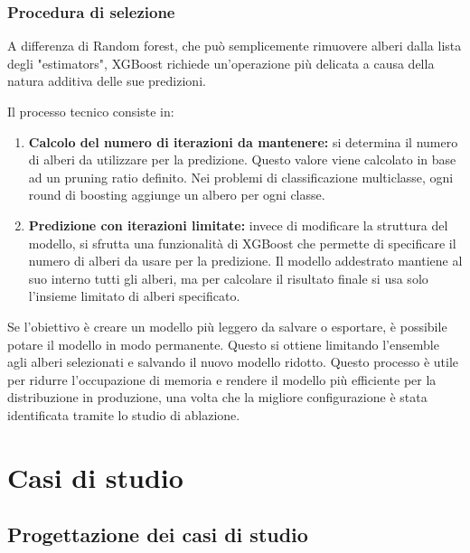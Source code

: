 \documentclass[a4paper,12pt]{report}
\begin{document}
	\subsection{Procedura di selezione}
	A differenza di Random forest, che può semplicemente rimuovere alberi dalla lista degli "estimators", XGBoost richiede un'operazione più delicata a causa della natura additiva delle sue predizioni.
	
	Il processo tecnico consiste in:
	\begin{enumerate}
		\item \textbf{Calcolo del numero di iterazioni da mantenere:} si determina il numero di alberi da utilizzare per la predizione. Questo valore viene calcolato in base ad un pruning ratio definito. Nei problemi di classificazione multiclasse, ogni round di boosting aggiunge un albero per ogni classe.
		\item \textbf{Predizione con iterazioni limitate:} invece di modificare la struttura del modello, si sfrutta una funzionalità di XGBoost che permette di specificare il numero di alberi da usare per la predizione. Il modello addestrato mantiene al suo interno tutti gli alberi, ma per calcolare il risultato finale si usa solo l'insieme limitato di alberi specificato.
	\end{enumerate}
	
	Se l'obiettivo è creare un modello più leggero da salvare o esportare, è possibile potare il modello in modo permanente. Questo si ottiene limitando l'ensemble agli alberi selezionati e salvando il nuovo modello ridotto. Questo processo è utile per ridurre l'occupazione di memoria e rendere il modello più efficiente per la distribuzione in produzione, una volta che la migliore configurazione è stata identificata tramite lo studio di ablazione.
	
	\chapter{Casi di studio}
	
	\section{Progettazione dei casi di studio}
	
\end{document}
